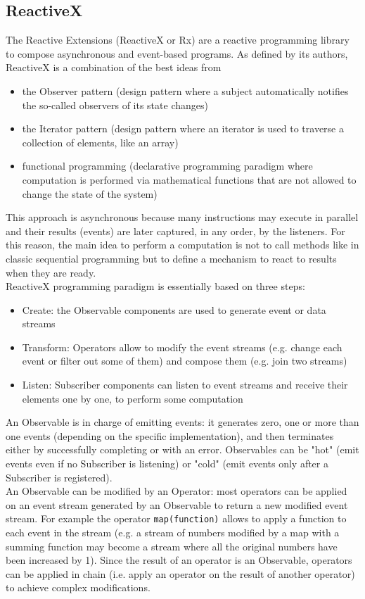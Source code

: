 \documentclass[11pt,a4paper,notitlepage]{article}
\begin{document}
\subsection{ReactiveX}
The Reactive Extensions (ReactiveX or Rx) are a reactive programming library to compose asynchronous and event-based programs. As defined by its authors, ReactiveX is a combination of the best ideas from
\begin{itemize}
	\item the Observer pattern (design pattern where a subject automatically notifies the so-called observers of its state changes)
	\item the Iterator pattern (design pattern where an iterator is used to traverse a collection of elements, like an array)
	\item functional programming (declarative programming paradigm where computation is performed via mathematical functions that are not allowed to change the state of the system)
\end{itemize}
This approach is asynchronous because many instructions may execute in parallel and their results (events) are later captured, in any order, by the listeners. For this reason, the main idea to perform a computation is not to call methods like in classic sequential programming but to define a mechanism to react to results when they are ready.\bigskip \\
ReactiveX programming paradigm is essentially based on three steps:
\begin{itemize}
	\item Create: the Observable components are used to generate event or data streams
	\item Transform: Operators allow to modify the event streams (e.g. change each event or filter out some of them) and compose them (e.g. join two streams)
	\item Listen: Subscriber components can listen to event streams and receive their elements one by one, to perform some computation
\end{itemize}
An Observable is in charge of emitting events: it generates zero, one or more than one events (depending on the specific implementation), and then terminates either by successfully completing or with an error. Observables can be "hot" (emit events even if no Subscriber is listening) or "cold" (emit events only after a Subscriber is registered).\medskip \\
An Observable can be modified by an Operator: most operators can be applied on an event stream generated by an Observable to return a new modified event stream. For example the operator \texttt{map(function)} allows to apply a function to each event in the stream (e.g. a stream of numbers modified by a map with a summing function may become a stream where all the original numbers have been increased by 1). Since the result of an operator is an Observable, operators can be applied in chain (i.e. apply an operator on the result of another operator) to achieve complex modifications.\medskip \\
\end{document}
